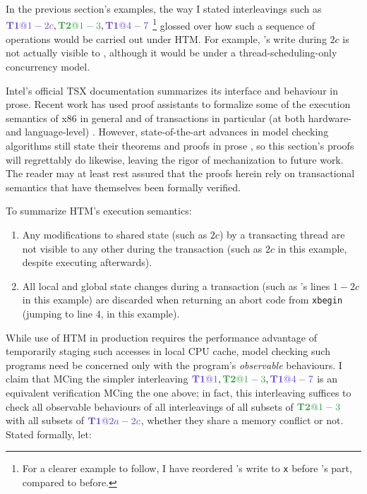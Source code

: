 In the previous section's examples,
the way I stated interleavings such as $\tiat{1-2c}, \tjat{1-3}, \tiat{4-7}$%
\footnote{For a clearer example to follow, I have reordered \ti's write to {\tt x} before \tj's part, compared to before.}
glossed over
how such a sequence of operations would be carried out under HTM.
For example, \ti's write during $2c$ is not actually visible to \tj,
although it would be under a thread-scheduling-only concurrency model.

Intel's official TSX documentation \cite{intel-tsx-overview}
summarizes its interface and behaviour in prose.
Recent work has used proof assistants to formalize some of the execution semantics
of x86 in general \cite{x86-semantics}
and of transactions in particular (at both hardware- and language-level) \cite{relaxed-transactions-pldi}.
However, state-of-the-art advances in model checking algorithms
still state their theorems and proofs in prose \cite{bpor,optimal-dpor,tsopso,satcheck,mcr,quicksand,rcmc},
so this section's proofs will regrettably do likewise,
leaving the rigor of mechanization to future work.
The reader may at least rest assured that the proofs herein
rely on transactional semantics that have themselves been formally verified.

To summarize HTM's execution semantics:

\begin{enumerate}
	\item Any modifications to shared state (such as $2c$) by a transacting thread
		are not visible to any other during the transaction
		(such as $2c$ in this example, despite \tj executing afterwards).
	\item All local and global state changes during a transaction
		(such as \ti's lines $1-2c$ in this example)
		are discarded when returning an abort code from {\tt xbegin}
		(jumping to line $4$, in this example).
\end{enumerate}

While use of HTM in production requires the performance advantage
of temporarily staging such accesses in local CPU cache,
model checking such programs need be concerned only with the program's {\em observable} behaviours.
I claim that MCing the simpler interleaving $\tiat{1}, \tjat{1-3}, \tiat{4-7}$
is an equivalent verification  MCing the one above;
in fact, this interleaving suffices to check
all observable behaviours
of all interleavings
of all subsets of $\tjat{1-3}$
with all subsets of $\tiat{2a-2c}$,
whether they share a memory conflict or not.
Stated formally, let:

